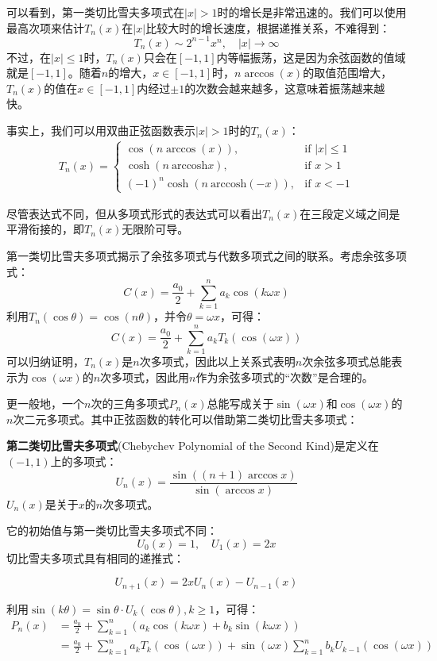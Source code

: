 可以看到，第一类切比雪夫多项式在$|x|>1$时的增长是非常迅速的。我们可以使用最高次项来估计$T_n(x)$在$|x|$比较大时的增长速度，根据递推关系，不难得到：
$$T_n(x)\sim 2^{n-1}x^n,\quad |x|\to\infty$$
不过，在$|x|\le 1$时，$T_n(x)$只会在$[-1,1]$内等幅振荡，这是因为余弦函数的值域就是$[-1,1]$。随着$n$的增大，$x\in[-1,1]$时，$n\arccos(x)$的取值范围增大，$T_n(x)$的值在$x\in[-1,1]$内经过$\pm 1$的次数会越来越多，这意味着振荡越来越快。

事实上，我们可以用双曲正弦函数表示$|x|>1$时的$T_n(x)$：
\begin{align*}
    T_n(x)=\begin{cases}
        \cos(n\arccos(x)),&\text{if }|x|\le 1\\
        \cosh(n\ \mathrm{arccosh}x),&\text{if }x> 1\\
        (-1)^n\cosh(n\ \mathrm{arccosh}(-x)),&\text{if }x< -1
    \end{cases}
\end{align*}

尽管表达式不同，但从多项式形式的表达式可以看出$T_n(x)$在三段定义域之间是平滑衔接的，即$T_n(x)$无限阶可导。

第一类切比雪夫多项式揭示了余弦多项式与代数多项式之间的联系。考虑余弦多项式：
$$C(x)=\frac{a_0}{2}+\sum_{k=1}^n a_k\cos(k\omega x)$$
利用$T_n(\cos\theta)=\cos(n\theta)$，并令$\theta=\omega x$，可得：
$$C(x)=\frac{a_0}{2}+\sum_{k=1}^n a_k T_k(\cos(\omega x))$$
可以归纳证明，$T_n(x)$是$n$次多项式，因此以上关系式表明$n$次余弦多项式总能表示为$\cos(\omega x)$的$n$次多项式，因此用$n$作为余弦多项式的“次数”是合理的。

更一般地，一个$n$次的三角多项式$P_n(x)$总能写成关于$\sin(\omega x)$和$\cos(\omega x)$的$n$次二元多项式。其中正弦函数的转化可以借助第二类切比雪夫多项式：
\begin{definition}[第二类切比雪夫多项式]
    \textbf{第二类切比雪夫多项式}(Chebychev Polynomial of the Second Kind)是定义在$(-1,1)$上的多项式：
    $$U_n(x)=\frac{\sin((n+1)\arccos x)}{\sin(\arccos x)}$$
    $U_n(x)$是关于$x$的$n$次多项式。
\end{definition}

它的初始值与第一类切比雪夫多项式不同：
$$U_0(x)=1,\quad U_1(x)=2x$$
切比雪夫多项式具有相同的递推式：
\begin{theorem}[第二类切比雪夫多项式的递推公式]
    $$U_{n+1}(x)=2xU_n(x)-U_{n-1}(x)$$
\end{theorem}

利用$\sin(k\theta)=\sin\theta \cdot U_k(\cos\theta),k\ge 1$，可得：
\begin{align*}
    P_n(x)&=\frac{a_0}{2}+\sum_{k=1}^n(a_k\cos(k\omega x)+b_k\sin(k\omega x))\\
    &=\frac{a_0}{2}+\sum_{k=1}^n a_k T_k(\cos(\omega x))+\sin(\omega x)\sum_{k=1}^n b_k U_{k-1}(\cos(\omega x))
\end{align*}

